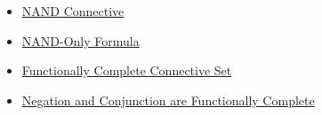 \begin{dependencies}
\begin{itemize}
  \item \hyperref[def:nand-connective-propositional-logic]{NAND Connective}
  \item \hyperref[def:nand-only-formula-propositional-logic]{NAND-Only Formula}
  \item \hyperref[def:functionally-complete-connective-set-propositional-logic]{Functionally Complete Connective Set}
  \item \hyperref[thm:negation-conjunction-functionally-complete-propositional-logic]{Negation and Conjunction are Functionally Complete}
\end{itemize}
\end{dependencies}
